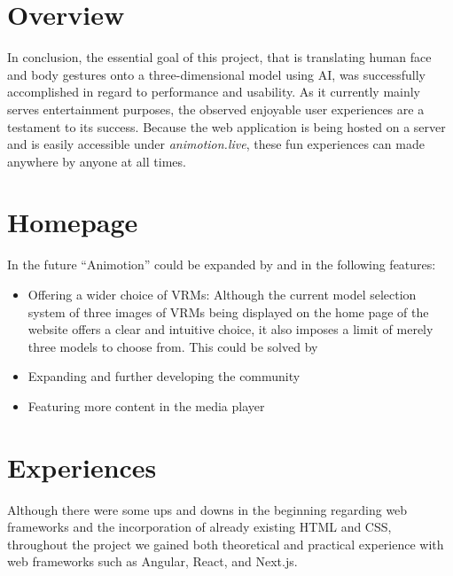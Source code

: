 \section{Overview}
In conclusion, the essential goal of this project, that is translating human face and body gestures onto 
a three-dimensional model using AI, was successfully accomplished in regard to performance and usability. 
As it currently mainly serves entertainment purposes, the observed enjoyable user experiences are a testament
to its success. Because the web application is being hosted on a server and is easily accessible under 
\emph{animotion.live}, these fun experiences can made anywhere by anyone at all times.

\section{Homepage}
In the future “Animotion” could be expanded by and in the following features:
\begin{itemize}
    \item Offering a wider choice of VRMs: Although the current model selection system of three images of VRMs being displayed on the home page of the website offers a clear and intuitive choice, it also imposes a limit of merely three models to choose from. This could be solved by
    \item Expanding and further developing the community
    \item Featuring more content in the media player
\end{itemize}

\section{Experiences}
Although there were some ups and downs in the beginning regarding web frameworks and the incorporation of already
existing HTML and CSS, throughout the project we gained both theoretical and practical experience with web frameworks
such as Angular, React, and Next.js.
